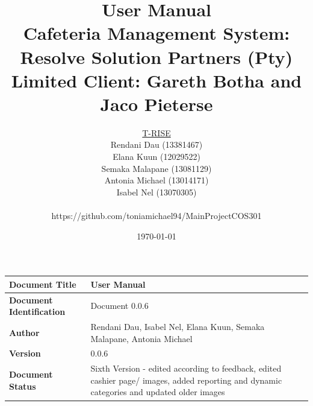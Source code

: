 \documentclass[a4paper,12pt]{report}
\title{\Huge User Manual \\ 
	Cafeteria Management System: Resolve Solution Partners (Pty) Limited }
\title{\Small Client: Gareth Botha and Jaco Pieterse }
\author{
         \underline{T-RISE}\\
          Rendani Dau (13381467) \\
	Elana Kuun (12029522) \\
	Semaka Malapane (13081129) \\
	Antonia Michael (13014171) \\
	Isabel Nel (13070305) \\ \\
	https://github.com/toniamichael94/MainProjectCOS301}
\date{\today}
\begin{document}
\maketitle
\break

\tableofcontents
\break


 \begin{tabu} to 0.8\textwidth { | X[l] | X[l] | }
 \hline
 \textbf{Document Title} & User Manual \\
 \hline
 \textbf{Document Identification}  & Document 0.0.6  \\
 \hline
 \textbf{Author}  & Rendani Dau, Isabel Nel, Elana Kuun, Semaka Malapane, Antonia Michael \\
 \hline
 \textbf{Version} & 0.0.6 \\
 \hline
 \textbf{Document Status} & Sixth Version - edited according to feedback, edited cashier page/ images, added reporting and dynamic categories and updated older images\\
 \hline
 \end{tabu}
\end{document}
